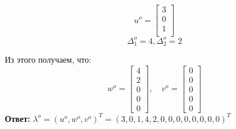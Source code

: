 \documentclass[11pt]{article}
\begin{document}
$$
u^o = 
\begin{bmatrix}
	3\\0\\1\\
\end{bmatrix}
$$
$$
\Delta_1^o = 4, \Delta_2^o = 2
$$

Из этого получаем, что:
$$
w^o = \begin{bmatrix}
	4\\2\\0\\0\\0
\end{bmatrix},\quad
v^o = \begin{bmatrix}
	0\\0\\0\\0\\0
\end{bmatrix}
$$
\textbf{Ответ: } $\lambda^o = (u^o, w^o, v^o)^T =  (3, 0 , 1, 4, 2, 0, 0, 0, 0, 0, 0, 0, 0)^T$
\end{document}
